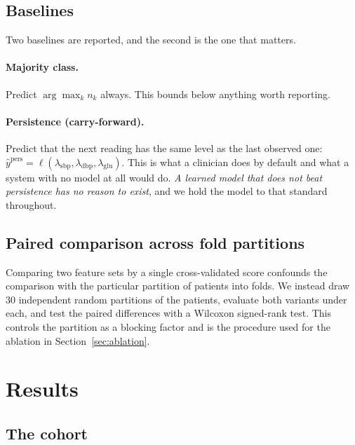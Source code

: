 \documentclass[11pt,a4paper]{article}
\newcommand{\sbp}{\mathrm{sbp}}
\newcommand{\dbp}{\mathrm{dbp}}
\newcommand{\glu}{\mathrm{glu}}
\begin{document}
\subsection{Baselines}

Two baselines are reported, and the second is the one that matters.

\paragraph{Majority class.} Predict $\arg\max_k n_k$ always. This bounds below
anything worth reporting.

\paragraph{Persistence (carry-forward).} Predict that the next reading has the same
level as the last observed one:
$\hat y^{\text{pers}} = \ell(\lambda_{\sbp},\lambda_{\dbp},\lambda_{\glu})$.
This is what a clinician does by default and what a system with no model at all
would do. \emph{A learned model that does not beat persistence has no reason to
exist}, and we hold the model to that standard throughout.

\subsection{Paired comparison across fold partitions}

Comparing two feature sets by a single cross-validated score confounds the
comparison with the particular partition of patients into folds. We instead draw
$30$ independent random partitions of the patients, evaluate both variants under
each, and test the paired differences with a Wilcoxon signed-rank test. This
controls the partition as a blocking factor and is the procedure used for the
ablation in Section~\ref{sec:ablation}.

\section{Results}
\label{sec:results}

\subsection{The cohort}
\end{document}
